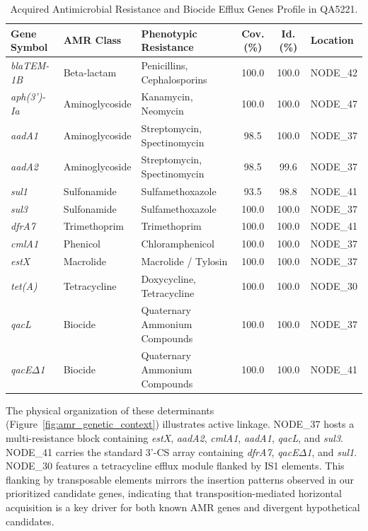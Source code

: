 \documentclass[pdflatex,sn-mathphys-num]{sn-jnl}
\begin{document}
\begin{table}[h]
\centering
\caption{Acquired Antimicrobial Resistance and Biocide Efflux Genes Profile in QA5221.}
\label{tab:amr_profile}
\begin{tabular}{lllccl}
\toprule
\textbf{Gene Symbol} & \textbf{AMR Class} & \textbf{Phenotypic Resistance} & \textbf{Cov. (\%)} & \textbf{Id. (\%)} & \textbf{Location} \\
\midrule
\textit{blaTEM-1B} & Beta-lactam & Penicillins, Cephalosporins & 100.0 & 100.0 & NODE\_42 \\
\textit{aph(3')-Ia} & Aminoglycoside & Kanamycin, Neomycin & 100.0 & 100.0 & NODE\_47 \\
\textit{aadA1} & Aminoglycoside & Streptomycin, Spectinomycin & 98.5 & 100.0 & NODE\_37 \\
\textit{aadA2} & Aminoglycoside & Streptomycin, Spectinomycin & 98.5 & 99.6 & NODE\_37 \\
\textit{sul1} & Sulfonamide & Sulfamethoxazole & 93.5 & 98.8 & NODE\_41 \\
\textit{sul3} & Sulfonamide & Sulfamethoxazole & 100.0 & 100.0 & NODE\_37 \\
\textit{dfrA7} & Trimethoprim & Trimethoprim & 100.0 & 100.0 & NODE\_41 \\
\textit{cmlA1} & Phenicol & Chloramphenicol & 100.0 & 100.0 & NODE\_37 \\
\textit{estX} & Macrolide & Macrolide / Tylosin & 100.0 & 100.0 & NODE\_37 \\
\textit{tet(A)} & Tetracycline & Doxycycline, Tetracycline & 100.0 & 100.0 & NODE\_30 \\
\textit{qacL} & Biocide & Quaternary Ammonium Compounds & 100.0 & 100.0 & NODE\_37 \\
\textit{qacE$\Delta$1} & Biocide & Quaternary Ammonium Compounds & 100.0 & 100.0 & NODE\_41 \\
\bottomrule
\end{tabular}
\end{table}

The physical organization of these determinants (Figure~\ref{fig:amr_genetic_context}) illustrates active linkage. NODE\_37 hosts a multi-resistance block containing \textit{estX}, \textit{aadA2}, \textit{cmlA1}, \textit{aadA1}, \textit{qacL}, and \textit{sul3}. NODE\_41 carries the standard 3'-CS array containing \textit{dfrA7}, \textit{qacE$\Delta$1}, and \textit{sul1}. NODE\_30 features a tetracycline efflux module flanked by IS1 elements. This flanking by transposable elements mirrors the insertion patterns observed in our prioritized candidate genes, indicating that transposition-mediated horizontal acquisition is a key driver for both known AMR genes and divergent hypothetical candidates. 
\end{document}
